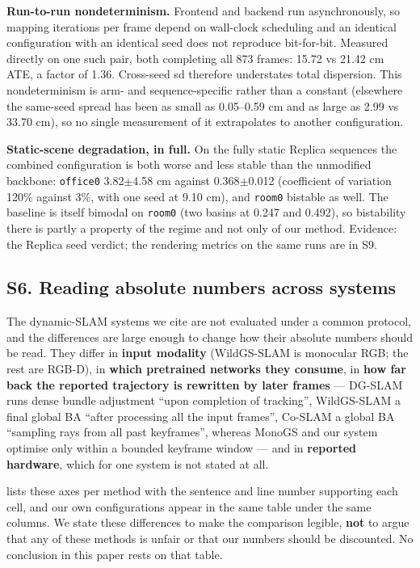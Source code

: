 \textbf{Run-to-run nondeterminism.} Frontend and backend run asynchronously, so mapping iterations per frame depend on wall-clock scheduling and an identical configuration with an identical seed does not reproduce bit-for-bit. Measured directly on one such pair, both completing all 873 frames: 15.72 vs 21.42 cm ATE, a factor of 1.36. Cross-seed sd therefore understates total dispersion. This nondeterminism is arm- and sequence-specific rather than a constant (elsewhere the same-seed spread has been as small as 0.05--0.59 cm and as large as 2.99 vs 33.70 cm), so no single measurement of it extrapolates to another configuration.


\textbf{Static-scene degradation, in full.} On the fully static Replica sequences the combined configuration is both worse and less stable than the unmodified backbone: \texttt{office0} 3.82$\pm$4.58 cm against 0.368$\pm$0.012 (coefficient of variation 120\% against 3\%, with one seed at 9.10 cm), and \texttt{room0} bistable as well. The baseline is itself bimodal on \texttt{room0} (two basins at 0.247 and 0.492), so bistability there is partly a property of the regime and not only of our method. Evidence: the Replica seed verdict; the rendering metrics on the same runs are in S9.




\subsection{S6. Reading absolute numbers across systems}


The dynamic-SLAM systems we cite are not evaluated under a common protocol, and the differences are large enough to change how their absolute numbers should be read. They differ in \textbf{input modality} (WildGS-SLAM is monocular RGB; the rest are RGB-D), in \textbf{which pretrained networks they consume}, in \textbf{how far back the reported trajectory is rewritten by later frames} --- DG-SLAM runs dense bundle adjustment ``upon completion of tracking'', WildGS-SLAM a final global BA ``after processing all the input frames'', Co-SLAM a global BA ``sampling rays from all past keyframes'', whereas MonoGS and our system optimise only within a bounded keyframe window --- and in \textbf{reported hardware}, which for one system is not stated at all.


 lists these axes per method with the sentence and line number supporting each cell, and our own configurations appear in the same table under the same columns. We state these differences to make the comparison legible, \textbf{not} to argue that any of these methods is unfair or that our numbers should be discounted. No conclusion in this paper rests on that table.




